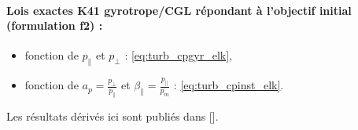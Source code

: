 {\begin{minipage}[c]{\linewidth}
\paragraph{Lois exactes \acs{K41} gyrotrope/\ac{CGL} répondant à l'objectif initial (formulation f2) :} 
\begin{itemize}
    \item fonction de $p_{\parallel}$ et $p_{\perp}$ : \eqref{eq:turb_cpgyr_elk},
    \item fonction de $a_p = \frac{p_{\perp}}{p_{\parallel}}$ et $\beta_{\parallel} = \frac{p_{\parallel}}{p_m}$ : \eqref{eq:turb_cpinst_elk}.
\end{itemize}

Les résultats dérivés ici sont publiés dans [\cite{simon_exact_2022}]. 
\end{minipage}}
